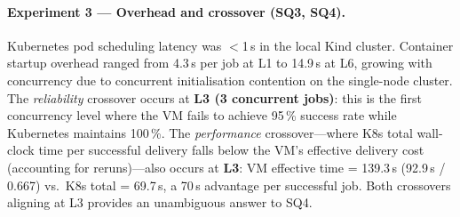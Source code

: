 \paragraph{Experiment 3 --- Overhead and crossover (SQ3, SQ4).}
Kubernetes pod scheduling latency was $<$1\,s in the local Kind cluster.
Container startup overhead ranged from 4.3\,s per job at L1 to 14.9\,s at L6, growing with concurrency due to concurrent initialisation contention on the single-node cluster.
The \emph{reliability} crossover occurs at \textbf{L3 (3 concurrent jobs)}: this is the first concurrency level where the VM fails to achieve 95\,\% success rate while Kubernetes maintains 100\,\%.
The \emph{performance} crossover---where K8s total wall-clock time per successful delivery falls below the VM's effective delivery cost (accounting for reruns)---also occurs at \textbf{L3}: VM effective time = 139.3\,s (92.9\,s / 0.667) vs.\  K8s total = 69.7\,s, a 70\,s advantage per successful job.
Both crossovers aligning at L3 provides an unambiguous answer to SQ4.

